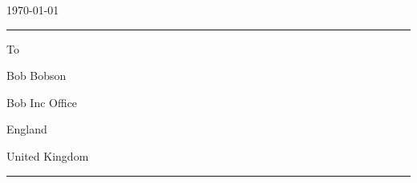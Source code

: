 \documentclass[12pt]{developercv} %
\begin{document}
{\begin{minipage}{\dimexpr1\textwidth-2\fboxrule-2\fboxsep\relax}
\end{minipage}}%


\vspace{+\baselineskip}
	\today



\vspace{+\baselineskip}
\hrule
\vspace{+\baselineskip}



\begin{minipage}[t]{0.8\textwidth}
{
To

\large Bob Bobson



\large  Bob Inc Office

\large England

\large United Kingdom



}

\end{minipage}


\vspace{+\baselineskip}
\hrule
\vspace{+\baselineskip}
\end{document}
